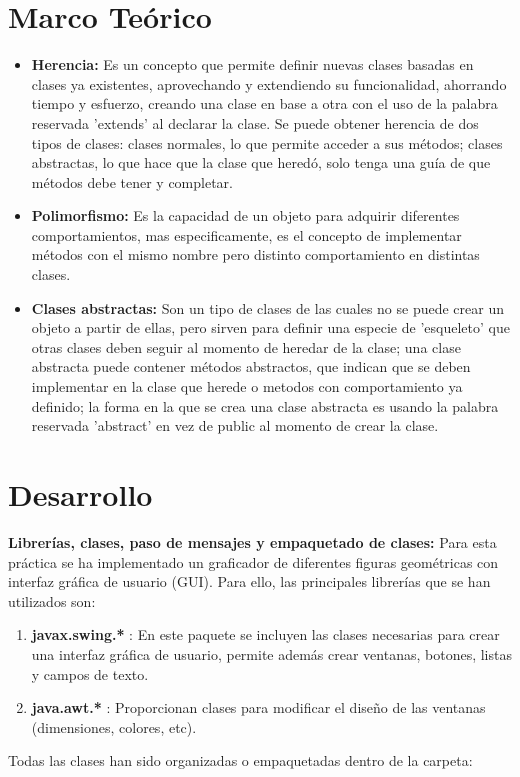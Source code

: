 \documentclass[letterpaper,12pt]{article}
\begin{document}
\section{Marco Teórico}
    \begin{itemize}
        \item \textbf{Herencia: }Es un concepto que permite definir nuevas clases basadas en clases ya existentes, aprovechando y extendiendo su funcionalidad, ahorrando tiempo y esfuerzo, creando una clase en base a otra con el uso de la palabra reservada 'extends' al declarar la clase.
        Se puede obtener herencia de dos tipos de clases: clases normales, lo que permite acceder a sus métodos; clases abstractas, lo que hace que la clase que heredó, solo tenga una guía de que métodos debe tener y completar.~\cite{HerenciaPolimorfismo}
        \item \textbf{Polimorfismo: }Es la capacidad de un objeto para adquirir diferentes comportamientos, mas especificamente, es el concepto de implementar métodos con el mismo nombre pero distinto comportamiento en distintas clases.~\cite{HerenciaPolimorfismo}
        \item \textbf{Clases abstractas: }Son un tipo de clases de las cuales no se puede crear un objeto a partir de ellas, pero sirven para  definir una especie de 'esqueleto' que otras clases deben seguir al momento de heredar de la clase; una clase abstracta puede contener métodos abstractos, que indican que se deben implementar en la clase que herede o metodos con comportamiento ya definido; la forma en la que se crea una clase abstracta es usando la palabra reservada 'abstract' en vez de public al momento de crear la clase.~\cite{Abstracto}
    \end{itemize}

\section{Desarrollo}
\textbf{Librerías, clases, paso de mensajes y empaquetado de clases:}
Para esta práctica se ha implementado un graficador de diferentes figuras geométricas con interfaz gráfica de usuario (GUI). Para ello, las principales librerías que se han utilizados son: 
\begin{enumerate}
    \item \textbf{javax.swing.*} : En este paquete se incluyen las clases necesarias para crear una interfaz gráfica de usuario, permite además crear ventanas, botones, listas y campos de texto.
    \item \textbf{java.awt.*} : Proporcionan clases para modificar el diseño de las ventanas (dimensiones, colores, etc).
\end{enumerate}
Todas las clases han sido organizadas o empaquetadas dentro de la carpeta: 
\end{document}
